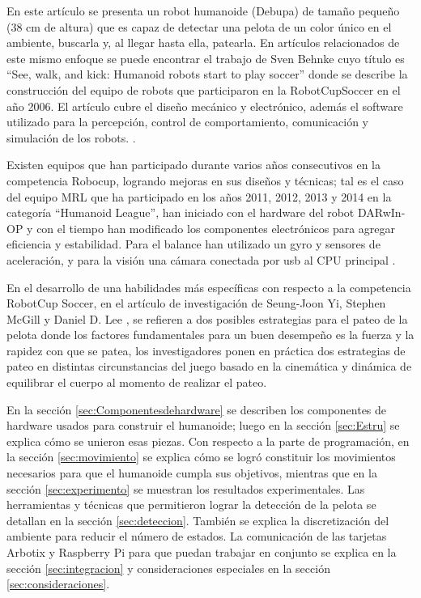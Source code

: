 \documentclass[conference, letterpaper]{IEEEtranMC1}
\begin{document}
En este artículo se presenta un robot humanoide (Debupa) de tamaño pequeño (38 cm de altura) que es capaz de detectar una pelota de un color único en el ambiente, buscarla y, al llegar hasta ella, patearla. En artículos relacionados de este mismo enfoque se puede encontrar el trabajo de Sven Behnke cuyo título es “See, walk, and kick: Humanoid robots start to play soccer” donde se describe la construcción del equipo de robots que participaron en la RobotCupSoccer en el a\~no 2006. El artículo cubre el diseño mecánico y electrónico, además el software utilizado para la percepción, control de comportamiento, comunicación y simulación de los robots. \cite{paper}. 

Existen equipos que han participado durante varios años consecutivos en la competencia Robocup, logrando mejoras en sus diseños y técnicas; tal es el caso del equipo MRL que ha participado en los años 2011, 2012, 2013 y 2014 en la categoría “Humanoid League”, han iniciado con el hardware del robot DARwIn-OP y con el tiempo han modificado los componentes electrónicos para agregar eficiencia y estabilidad. Para el balance han utilizado un gyro y sensores de aceleración, y para la visión una cámara conectada por usb al CPU principal \cite{paper1}. 

En el desarrollo de una habilidades más específicas con respecto a la competencia RobotCup Soccer, en el artículo de investigación de Seung-Joon Yi, Stephen McGill y Daniel D. Lee  \cite{paper2}, se refieren a dos posibles estrategias para el pateo de la pelota donde los factores fundamentales para un buen desempeño es la fuerza y la rapidez con que se patea, los investigadores ponen en pr\'actica dos estrategias de pateo en distintas circunstancias del juego basado en la cinemática y dinámica de equilibrar el cuerpo al momento de realizar el pateo.

En la secci\'on \ref{sec:Componentesdehardware} se describen los componentes de hardware usados para construir el humanoide; luego en la sección \ref{sec:Estru}
 se explica cómo se unieron esas piezas. Con respecto a la parte de programación, en la secci\'on \ref{sec:movimiento} se explica c\'omo se logró constituir los movimientos necesarios para que el humanoide cumpla sus objetivos, mientras que en la secci\'on \ref{sec:experimento} se muestran los resultados experimentales. Las herramientas y técnicas  que  permitieron lograr  la detección de la pelota se detallan en la secci\'on \ref{sec:deteccion}. También se explica la discretización del ambiente para reducir el n\'umero de estados. La comunicación de las tarjetas Arbotix y Raspberry Pi para que puedan trabajar en conjunto se explica en la secci\'on \ref{sec:integracion}  y consideraciones especiales en la secci\'on \ref{sec:consideraciones}. 
\end{document}
